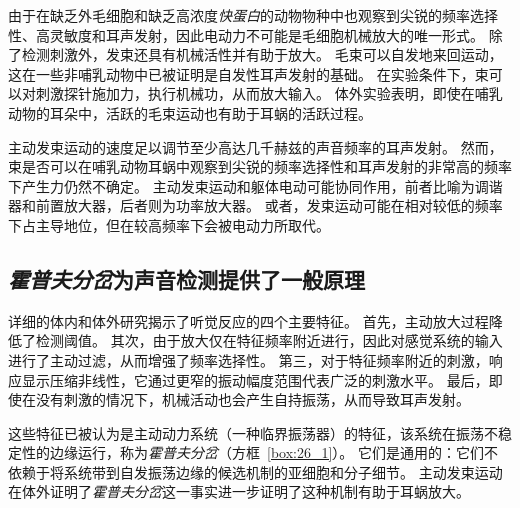由于在缺乏外毛细胞和缺乏高浓度\textit{快蛋白}的动物物种中也观察到尖锐的频率选择性、高灵敏度和耳声发射，因此电动力不可能是毛细胞机械放大的唯一形式。
除了检测刺激外，发束还具有机械活性并有助于放大。
毛束可以自发地来回运动，这在一些非哺乳动物中已被证明是自发性耳声发射的基础。
在实验条件下，束可以对刺激探针施加力，执行机械功，从而放大输入。
体外实验表明，即使在哺乳动物的耳朵中，活跃的毛束运动也有助于耳蜗的活跃过程。


主动发束运动的速度足以调节至少高达几千赫兹的声音频率的耳声发射。
然而，束是否可以在哺乳动物耳蜗中观察到尖锐的频率选择性和耳声发射的非常高的频率下产生力仍然不确定。
主动发束运动和躯体电动可能协同作用，前者比喻为调谐器和前置放大器，后者则为功率放大器。
或者，发束运动可能在相对较低的频率下占主导地位，但在较高频率下会被电动力所取代。



\subsection{\textit{霍普夫分岔}为声音检测提供了一般原理}

详细的体内和体外研究揭示了听觉反应的四个主要特征。
首先，主动放大过程降低了检测阈值。
其次，由于放大仅在特征频率附近进行，因此对感觉系统的输入进行了主动过滤，从而增强了频率选择性。
第三，对于特征频率附近的刺激，响应显示压缩非线性，它通过更窄的振动幅度范围代表广泛的刺激水平。
最后，即使在没有刺激的情况下，机械活动也会产生自持振荡，从而导致耳声发射。


这些特征已被认为是主动动力系统（一种临界振荡器）的特征，该系统在振荡不稳定性的边缘运行，称为\textit{霍普夫分岔}（方框~\ref{box:26_1}）。
它们是通用的：它们不依赖于将系统带到自发振荡边缘的候选机制的亚细胞和分子细节。
主动发束运动在体外证明了\textit{霍普夫分岔}这一事实进一步证明了这种机制有助于耳蜗放大。



